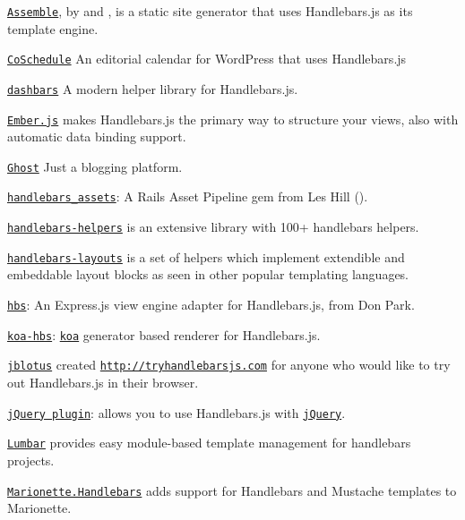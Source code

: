 \begin{DoxyItemize}
\item \href{http://assemble.io}{\tt Assemble}, by \href{https://github.com/jonschlinkert}{\tt } and \href{https://github.com/doowb}{\tt }, is a static site generator that uses Handlebars.\+js as its template engine.
\item \href{http://coschedule.com}{\tt Co\+Schedule} An editorial calendar for Word\+Press that uses Handlebars.\+js
\item \href{https://github.com/pismute/dashbars}{\tt dashbars} A modern helper library for Handlebars.\+js.
\item \href{http://www.emberjs.com}{\tt Ember.\+js} makes Handlebars.\+js the primary way to structure your views, also with automatic data binding support.
\item \href{https://ghost.org/}{\tt Ghost} Just a blogging platform.
\item \href{http://github.com/leshill/handlebars_assets}{\tt handlebars\+\_\+assets}\+: A Rails Asset Pipeline gem from Les Hill ().
\item \href{https://github.com/assemble/handlebars-helpers}{\tt handlebars-\/helpers} is an extensive library with 100+ handlebars helpers.
\item \href{https://github.com/shannonmoeller/handlebars-layouts}{\tt handlebars-\/layouts} is a set of helpers which implement extendible and embeddable layout blocks as seen in other popular templating languages.
\item \href{http://github.com/donpark/hbs}{\tt hbs}\+: An Express.\+js view engine adapter for Handlebars.\+js, from Don Park.
\item \href{https://github.com/jwilm/koa-hbs}{\tt koa-\/hbs}\+: \href{https://github.com/koajs/koa}{\tt koa} generator based renderer for Handlebars.\+js.
\item \href{http://github.com/jblotus}{\tt jblotus} created \href{http://tryhandlebarsjs.com}{\tt http\+://tryhandlebarsjs.\+com} for anyone who would like to try out Handlebars.\+js in their browser.
\item \href{http://71104.github.io/jquery-handlebars/}{\tt j\+Query plugin}\+: allows you to use Handlebars.\+js with \href{http://jquery.com/}{\tt j\+Query}.
\item \href{http://walmartlabs.github.io/lumbar}{\tt Lumbar} provides easy module-\/based template management for handlebars projects.
\item \href{https://github.com/hashchange/marionette.handlebars}{\tt Marionette.\+Handlebars} adds support for Handlebars and Mustache templates to Marionette.

\end{DoxyItemize}
